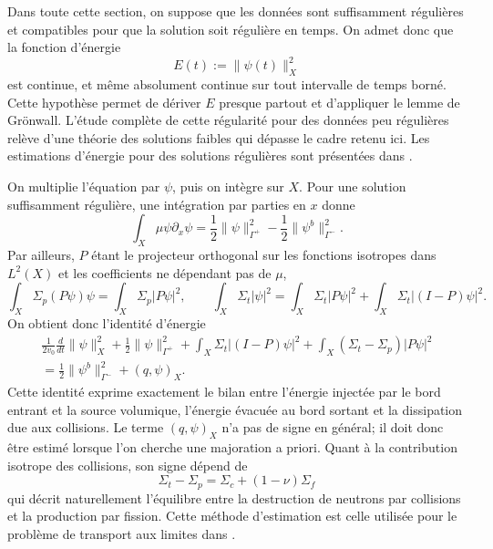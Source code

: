 \documentclass{article}
\begin{document}
Dans toute cette section, on suppose que les données sont suffisamment régulières et compatibles pour que la solution soit régulière en temps. On admet donc que la fonction d'énergie
\[
E(t):=\|\psi(t)\|_X^2
\]
est continue, et même absolument continue sur tout intervalle de temps borné. Cette hypothèse permet de dériver $E$ presque partout et d'appliquer le lemme de Grönwall. L'étude complète de cette régularité pour des données peu régulières relève d'une théorie des solutions faibles qui dépasse le cadre retenu ici. Les estimations d'énergie pour des solutions régulières sont présentées dans \cite[chap.~2, section~2.5]{Allaire2018}.

On multiplie l'équation par \(\psi\), puis on intègre sur $X$. Pour une solution suffisamment régulière, une intégration par parties en $x$ donne
\[
\int_X\mu\psi\partial_x\psi
=\frac12\|\psi\|_{\Gamma^+}^2
-\frac12\|\psi^b\|_{\Gamma^-}^2.
\]
Par ailleurs, $P$ étant le projecteur orthogonal sur les fonctions isotropes dans $L^2(X)$ et les coefficients ne dépendant pas de $\mu$,
\[
\int_X\Sigma_p(P\psi)\psi=\int_X\Sigma_p|P\psi|^2,
\qquad
\int_X\Sigma_t|\psi|^2
=\int_X\Sigma_t|P\psi|^2+\int_X\Sigma_t|(I-P)\psi|^2.
\]
On obtient donc l'identité d'énergie
\begin{equation}
\begin{aligned}
\frac1{2v_0}\frac{d}{dt}\|\psi\|_X^2
+\frac12\|\psi\|_{\Gamma^+}^2
+\int_X\Sigma_t|(I-P)\psi|^2
+\int_X(\Sigma_t-\Sigma_p)|P\psi|^2 \\
=\frac12\|\psi^b\|_{\Gamma^-}^2+(q,\psi)_X.
\end{aligned}
\label{eq:energie-transport}
\end{equation}
Cette identité exprime exactement le bilan entre l'énergie injectée par le bord entrant et la source volumique, l'énergie évacuée au bord sortant et la dissipation due aux collisions. Le terme $(q,\psi)_X$ n'a pas de signe en général; il doit donc être estimé lorsque l'on cherche une majoration a priori. Quant à la contribution isotrope des collisions, son signe dépend de
\[ \Sigma_t - \Sigma_p = \Sigma_c + (1-\nu)\Sigma_f\]
qui décrit naturellement l'équilibre entre la destruction de neutrons par collisions et la production par fission. Cette méthode d'estimation est celle utilisée pour le problème de transport aux limites dans \cite[chap.~2, section~2.5 et chap.~3, section~3.2.2]{Allaire2018}.
\end{document}

